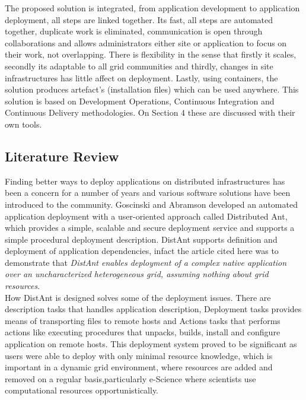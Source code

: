 \documentclass [titlepage,11pt]{article}
\begin{document}
The proposed solution is integrated, from application development to application deployment, all steps are linked together. Its fast, all steps are automated together, duplicate work is eliminated, communication is open through collaborations and allows administrators either site or application to focus on their work, not overlapping. There is flexibility in the sense that firstly it scales, secondly its adaptable to all grid communities and thirdly, changes in site infrastructures has little affect on deployment. Lastly, using containers, the solution produces artefact's (installation files) which can be used anywhere. This solution is based on Development Operations, Continuous Integration and Continuous Delivery methodologies. On Section 4 these are discussed with their own tools. \\

\subsection{Literature Review }
Finding better ways to deploy applications on distributed infrastructures has been a concern for a number of years and various software solutions have been introduced to the community. Goscinski and Abramson \citet{wojtek05} developed an automated application deployment with a user-oriented approach called Distributed Ant, which provides a simple, scalable and secure deployment service and supports a simple procedural deployment description. DistAnt supports definition and deployment of application dependencies, infact the article cited here was to demonstrate that \emph{DistAnt enables deployment of a complex native application over an uncharacterized heterogeneous grid, assuming nothing about grid resources.} \\

How DistAnt is designed solves some of the deployment issues. There are description tasks that handles application description, Deployment tasks provides means of transporting files to remote hosts and Actions tasks that performs actions like executing procedures that unpacks, builds, install and configure application on remote hosts. This deployment system proved to be significant as users were able to deploy with only minimal resource knowledge, which is important in a dynamic grid environment, where resources are added and removed on a regular basis,particularly e-Science where scientists use computational resources opportunistically. \\
\end{document}

